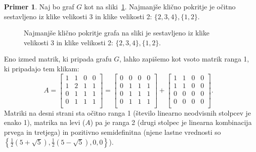 \documentclass[12pt,a4paper,twoside]{article}
\theoremstyle{definition} %
\newtheorem{primer}[definicija]{Primer}
\theoremstyle{plain} %
\numberwithin{equation}{section}  %
\begin{document}
\begin{primer}
    Naj bo graf $G$ kot na sliki~\ref{fig:primer-klicno-pokritje}. Najmanjše klično pokritje je očitno sestavljeno iz klike velikosti 3 in klike velikosti 2: $\{2, 3, 4\}, \{1,2\}$.
    \begin{figure}[h]
        \centering
        \caption{Najmanjše klično pokritje grafa na sliki je sestavljeno iz klike velikosti 3 in klike velikosti 2: $\{2, 3, 4\}, \{1,2\}$.}
        \label{fig:primer-klicno-pokritje}
    \end{figure}
    Eno izmed matrik, ki pripada grafu $G$, lahko zapišemo kot vsoto matrik ranga 1, ki pripadajo tem klikam:
    \[ A=
    \begin{bmatrix}
    1 & 1 & 0 & 0 \\
    1 & 2 & 1 & 1 \\
    0 & 1 & 1 & 1 \\
    0 & 1 & 1 & 1 \\
    \end{bmatrix} =
    \begin{bmatrix}
    0 & 0 & 0 & 0 \\
    0 & 1 & 1 & 1 \\
    0 & 1 & 1 & 1 \\
    0 & 1 & 1 & 1 \\
    \end{bmatrix} +
    \begin{bmatrix}
    1 & 1 & 0 & 0 \\
    1 & 1 & 0 & 0 \\
    0 & 0 & 0 & 0 \\
    0 & 0 & 0 & 0 \\
    \end{bmatrix}.
    \]
    Matriki na desni strani sta očitno ranga 1 (število linearno neodvisnih stolpcev je enako 1), matrika na levi ($A$) pa je ranga 2 (drugi stolpec je linearna kombinacija prvega in tretjega) in pozitivno semidefinitna (njene lastne vrednosti so $\left\{\frac{1}{2} \left(5+\sqrt{5}\right), \frac{1}{2} \left(5-\sqrt{5}\right), 0, 0 \right\}$).
\end{primer}
\end{document}
